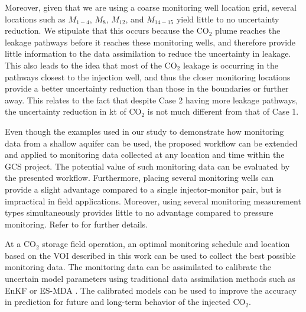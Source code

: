 \documentclass[a4paper,fleqn]{cas-sc}
\begin{document}
Moreover, given that we are using a coarse monitoring well location grid, several locations such as $M_{1-4}$, $M_8$, $M_{12}$, and $M_{14-15}$ yield little to no uncertainty reduction. We stipulate that this occurs because the CO$_2$ plume reaches the leakage pathways before it reaches these monitoring wells, and therefore provide little information to the data assimilation to reduce the uncertainty in leakage. This also leads to the idea that most of the CO$_2$ leakage is occurring in the pathways closest to the injection well, and thus the closer monitoring locations provide a better uncertainty reduction than those in the boundaries or further away. This relates to the fact that despite Case 2 having more leakage pathways, the uncertainty reduction in kt of CO$_2$ is not much different from that of Case 1.

Even though the examples used in our study to demonstrate how monitoring data from a shallow aquifer can be used, the proposed workflow can be extended and applied to monitoring data collected at any location and time within the GCS project. The potential value of such monitoring data can be evaluated by the presented workflow. Furthermore, placing several monitoring wells can provide a slight advantage compared to a single injector-monitor pair, but is impractical in field applications. Moreover, using several monitoring measurement types simultaneously provides little to no advantage compared to pressure monitoring. Refer to \citet{Chen2018} for further details.

At a CO$_2$ storage field operation, an optimal monitoring schedule and location based on the VOI described in this work can be used to collect the best possible monitoring data. The monitoring data can be assimilated to calibrate the uncertain model parameters using traditional data assimilation methods such as EnKF \citep{Evensen20091} or ES-MDA \citep{Emerick20133}. The calibrated models can be used to improve the accuracy in prediction for future and long-term behavior of the injected CO$_2$.

\end{document}
